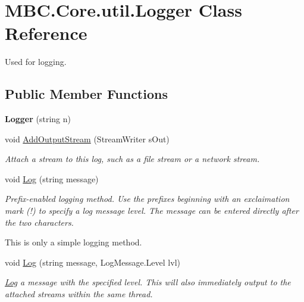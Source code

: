 \hypertarget{class_m_b_c_1_1_core_1_1util_1_1_logger}{\section{M\-B\-C.\-Core.\-util.\-Logger Class Reference}
\label{class_m_b_c_1_1_core_1_1util_1_1_logger}
}


Used for logging. 


\subsection*{Public Member Functions}
\begin{DoxyCompactItemize}
\item 
\hypertarget{class_m_b_c_1_1_core_1_1util_1_1_logger_ac2fdea5c1750f1dbc63fefde8bb0e12f}{{\bfseries Logger} (string n)}\label{class_m_b_c_1_1_core_1_1util_1_1_logger_ac2fdea5c1750f1dbc63fefde8bb0e12f}

\item 
\hypertarget{class_m_b_c_1_1_core_1_1util_1_1_logger_a21316aef85df8eb5decf285c50badfdc}{void \hyperlink{class_m_b_c_1_1_core_1_1util_1_1_logger_a21316aef85df8eb5decf285c50badfdc}{Add\-Output\-Stream} (Stream\-Writer s\-Out)}\label{class_m_b_c_1_1_core_1_1util_1_1_logger_a21316aef85df8eb5decf285c50badfdc}

\begin{DoxyCompactList}\small\item\em Attach a stream to this log, such as a file stream or a network stream.\end{DoxyCompactList}\item 
void \hyperlink{class_m_b_c_1_1_core_1_1util_1_1_logger_a9dbb38c93a6869f689516e8f3854981d}{Log} (string message)
\begin{DoxyCompactList}\small\item\em Prefix-\/enabled logging method. Use the prefixes beginning with an exclaimation mark (!) to specify a log message level. The message can be entered directly after the two characters.\par
 This is only a simple logging method.\par
 \end{DoxyCompactList}\item 
\hypertarget{class_m_b_c_1_1_core_1_1util_1_1_logger_ae4b2c81601b3af0189ca50c834268826}{void \hyperlink{class_m_b_c_1_1_core_1_1util_1_1_logger_ae4b2c81601b3af0189ca50c834268826}{Log} (string message, Log\-Message.\-Level lvl)}\label{class_m_b_c_1_1_core_1_1util_1_1_logger_ae4b2c81601b3af0189ca50c834268826}

\begin{DoxyCompactList}\small\item\em \hyperlink{class_m_b_c_1_1_core_1_1util_1_1_log}{Log} a message with the specified level. This will also immediately output to the attached streams within the same thread.\end{DoxyCompactList}\end{DoxyCompactItemize}



